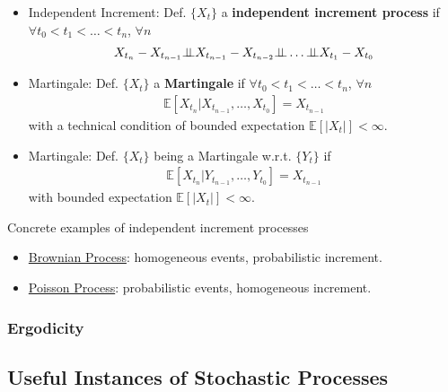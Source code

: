 \begin{itemize}[topsep=2pt,itemsep=0pt]
    \item Independent Increment: Def. $ \{X_t\} $ a \textbf{independent increment process} if $ \forall t_0<t_1<\ldots<t_n $, $ \forall n $
\begin{align}
    X_{t_{n}}-X_{t_{n-1}}\independent X_{t_{n-1}}-X_{t_{n-2}} \independent \ldots\independent X_{t_1}-X_{t_0}
\end{align}
    \item Martingale: Def. $ \{X_t\}  $ a \textbf{Martingale} if $ \forall t_0<t_1<\ldots<t_n $, $ \forall n $
    \begin{align}
        \mathbb{E}\left[ X_{t_n}|X_{t_{n-1}},\ldots,X_{t_0} \right] = X_{t_{n-1}} 
    \end{align}
    with a technical condition of bounded expectation $ \mathbb{E}\left[ |X_t| \right] <\infty $.
    \item Martingale: Def. $ \{X_t\}  $ being a Martingale w.r.t. $ \{Y_t\} $ if
    \begin{align}
        \mathbb{E}\left[ X_{t_n}|Y_{t_{n-1}},\ldots,Y_{t_0} \right] = X_{t_{n-1}} 
    \end{align}
    with bounded expectation $ \mathbb{E}\left[ |X_t| \right] <\infty $.

    
\end{itemize}

\begin{point}
    Concrete examples of independent increment processes
\end{point}

\begin{itemize}[topsep=2pt,itemsep=0pt]
    \item \hyperlink{BrownianProcess}{Brownian Process}: homogeneous events, probabilistic increment.
    \item \hyperlink{PoissonProcess}{Poisson Process}: probabilistic events, homogeneous increment.
\end{itemize}




\subsubsection{Ergodicity}






\subsection{Useful Instances of Stochastic Processes}

